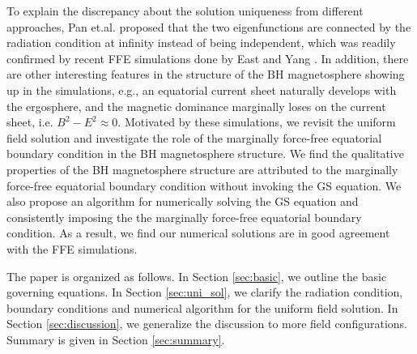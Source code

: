 \documentclass[aps,prd,reprint,nofootinbib, superscriptaddress]{revtex4-1}
\begin{document}
To explain the discrepancy about the solution uniqueness from different approaches, Pan et.al. \cite{Pan2017}
proposed that the two eigenfunctions are connected by the radiation condition at infinity instead of
being independent, which was readily confirmed by recent FFE simulations done
by East and Yang \cite{East2018}. In addition, there are other interesting features in the structure of the BH
magnetosphere showing up in the simulations, e.g., an equatorial current sheet naturally develops
with the ergosphere, and the magnetic dominance marginally loses on the current sheet, i.e. $B^2-E^2\approx 0$.
Motivated by these simulations, we revisit the uniform field solution and investigate the role of the
marginally force-free equatorial boundary condition in the BH magnetosphere structure.
We find the qualitative properties of the BH magnetosphere structure are attributed to the marginally
force-free equatorial boundary condition without invoking the GS equation.
We also  propose an algorithm for numerically solving the GS equation and
consistently imposing the the marginally force-free equatorial boundary condition.
As a result, we find our numerical solutions are in good agreement with the FFE simulations.


The paper is organized as follows.  In Section \ref{sec:basic}, we outline the basic governing equations.
In Section \ref{sec:uni_sol}, we clarify the radiation condition, boundary conditions and numerical algorithm
for the uniform field solution. In Section \ref{sec:discussion}, we generalize the discussion
to  more field configurations. Summary is given in Section \ref{sec:summary}.
\end{document}
